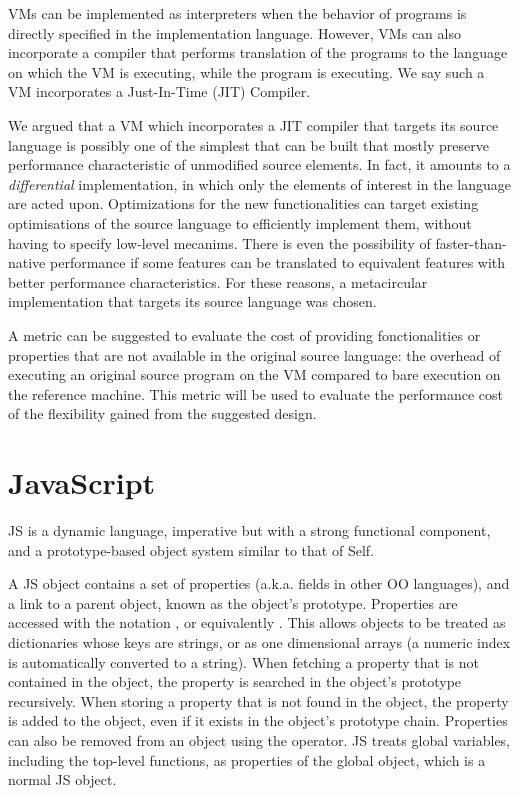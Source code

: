VMs can be implemented as interpreters when the behavior of
programs is directly specified in the implementation language.  However, VMs
can also incorporate a compiler that performs translation of the programs to
the language on which the VM is executing, while the program is executing. We
say such a VM incorporates a Just-In-Time (JIT) Compiler. 

We argued that a VM which incorporates a JIT compiler that
targets its source language is possibly one of the simplest that can be built
that mostly preserve performance characteristic of unmodified source elements.
In fact, it amounts to a \textit{differential} implementation, in which only
the elements of interest in the language are acted upon. Optimizations for the
new functionalities can target existing optimisations of the source language to
efficiently implement them, without having to specify low-level mecanims.
There is even the possibility of faster-than-native performance if some
features can be translated to equivalent features with better performance
characteristics. For these reasons, a metacircular implementation that targets
its source language was chosen.

A metric can be suggested to evaluate the cost of providing fonctionalities or
properties that are not available in the original source language: the overhead
of executing an original source program on the VM compared to bare execution on
the reference machine. This metric will be used to evaluate the performance
cost of the flexibility gained from the suggested design.

\section{JavaScript}

JS is a dynamic language, imperative but with a strong functional component,
and a prototype-based object system similar to that of Self.

A JS object contains a set of properties (a.k.a. fields in other OO languages),
and a link to a parent object, known as the object's prototype. Properties are
accessed with the notation , or equivalently .
This allows objects to be treated as dictionaries whose keys are strings, or as
one dimensional arrays (a numeric index is automatically converted to a
string).  When fetching a property that is not contained in the object, the
property is searched in the object's prototype recursively. When storing a
property that is not found in the object, the property is added to the object,
even if it exists in the object's prototype chain. Properties can also be
removed from an object using the  operator. JS treats global
variables, including the top-level functions, as properties of the global
object, which is a normal JS object.


